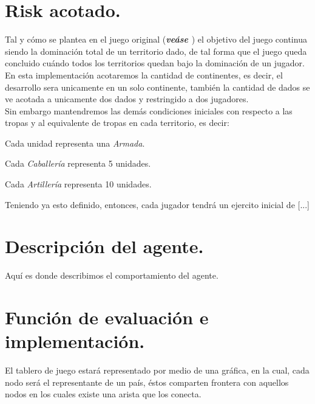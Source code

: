 \documentclass[12pt,twocolumn,draft]{article}
\begin{document}
\section{Risk acotado.}

Tal y c\'omo se plantea en el juego original (\textbf{\textit{ve\'ase \cite{RISK}}}) el objetivo del juego continua siendo la dominaci\'on total de un territorio dado, de tal forma
que el juego queda concluido cu\'ando todos los territorios quedan bajo la dominaci\'on de 
un jugador.\\
En esta implementaci\'on acotaremos la cantidad de continentes, es decir, el desarrollo sera unicamente en un solo continente, tambi\'en la cantidad de dados se ve acotada a unicamente dos dados y restringido a dos jugadores.\\

Sin embargo mantendremos las dem\'as condiciones iniciales con respecto a las tropas y al equivalente de tropas en cada territorio, es decir:
\begin{list}{*}{}
\item Cada unidad representa una \textit{Armada}.
\item Cada \textit{Caballer\'ia} representa 5 unidades.
\item Cada \textit{Artiller\'ia} representa 10 unidades.
\end{list}

Teniendo ya esto definido, entonces, cada jugador tendr\'a un ejercito inicial de [...]

\section{Descripci\'on del agente.}
Aqu\'i es donde describimos el comportamiento del agente.


\section{Funci\'on de evaluaci\'on e implementaci\'on.}
El tablero de juego estar\'a representado por medio de una gr\'afica, en la cual, cada nodo  ser\'a el representante de un pa\'is, \'estos comparten frontera con aquellos nodos en los cuales existe una arista que los conecta.\\
\end{document}
